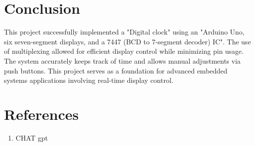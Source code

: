 \documentclass[journal,12pt,onecolumn,article]{IEEEtran}
\theoremstyle{remark}
\begin{document}
\section{Conclusion}
This project successfully implemented a "Digital clock" using an "Arduino Uno, six seven-segment displays, and a 7447 (BCD to 7-segment decoder) IC". The use of multiplexing allowed for efficient display control while minimizing pin usage. The system accurately keeps track of time and allows manual adjustments via push buttons. This project serves as a foundation for advanced embedded systems applications involving real-time display control.

\section{References}
\begin{enumerate}
	\item CHAT gpt
\end{enumerate}
\end{document}
